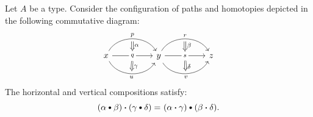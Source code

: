 \begin{lem}\label{lem:interchange-law} {}
    Let\/ $A$ be a type. Consider the configuration of paths and homotopies depicted in the following commutative diagram:
    \[
        \begin{tikzcd}[column sep=huge,
            row sep=huge]
            x
                \arrow[r, bend left=60, "p"{name=U1}]
                \arrow[r, "q"{name=M1, description}]
                \arrow[r, bend right=60, "u"'{name=D1}]
            & y
                \arrow[r, bend left=60, "r"{name=U2}]
                \arrow[r, "s"{name=M2, description}]
                \arrow[r, bend right=60, "v"'{name=D2}]
            & z
            \arrow[Rightarrow,
                from=U1,
                to=M1,
                "\alpha",
                shorten <=3pt,
                shorten >= 1pt]
            \arrow[Rightarrow,
                from=M1,
                to=D1,
                "\gamma",
                shorten <=2pt,
                shorten >= 3pt]
            \arrow[Rightarrow,
                from=U2,
                to=M2,
                "\beta",
                shorten <=3pt,
                shorten >= 1pt]
            \arrow[Rightarrow,
                from=M2,
                to=D2,
                "\delta",
                shorten <=2pt,
                shorten >= 3pt]
        \end{tikzcd}
    \]
    The horizontal and vertical compositions satisfy:
    \[
        (\alpha\hct\beta)\ct(\gamma\hct\delta)
        \eq{}
        (\alpha\ct\gamma)\hct(\beta\ct\delta).
    \]
\end{lem}

